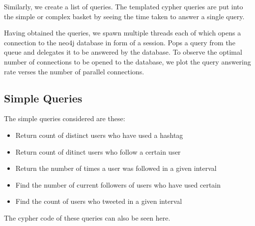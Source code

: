 \documentclass[letterpaper,10pt,english]{sphinxmanual}
\begin{document}
Similarly, we create a list of queries. The templated cypher queries are put into the simple or complex basket by seeing the time taken to answer a single query.

Having obtained the queries, we spawn multiple threads each of which opens a connection to the neo4j database in form of a session. Pops a query from the queue and delegates it to be answered by the database. To observe the optimal number of connections to be opened to the database, we plot the query answering rate verses the number of parallel connections.


\subsection{Simple Queries}
\label{\detokenize{benchmarking:simple-queries}}
The simple queries considered are these:
\begin{itemize}
\item {} 
Return count of distinct users who have used a hashtag

\item {} 
Return count of ditinct users who follow a certain user

\item {} 
Return the number of times a user was followed in a given interval

\item {} 
Find the number of current followers of users who have used certain

\item {} 
Find the count of users who tweeted in a given interval

\end{itemize}

The cypher code of these queries can also be seen here.
\end{document}
